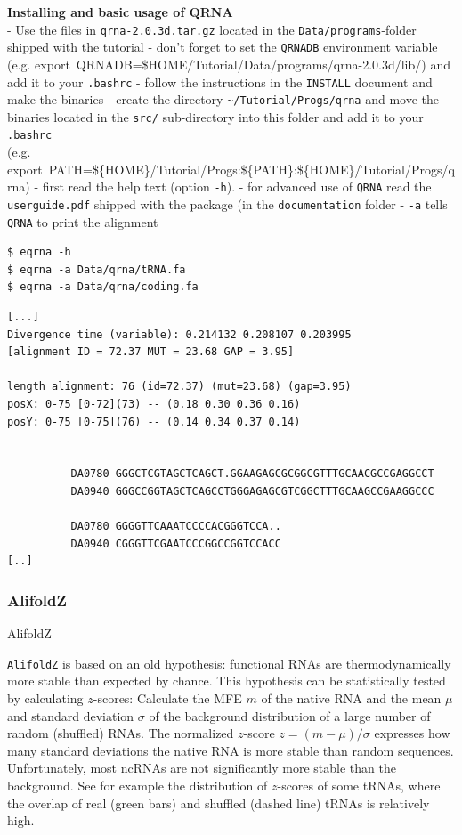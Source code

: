 \documentclass[]{article}
\begin{document}
\textbf{Installing and basic usage of QRNA}\\
- Use the files in \texttt{qrna-2.0.3d.tar.gz} located in the
\texttt{Data/programs}-folder shipped with the tutorial - don't forget
to set the \texttt{QRNADB} environment variable\\
 (e.g. {{export~QRNADB=\$HOME/Tutorial/Data/programs/qrna-2.0.3d/lib/}})
and add it to your \texttt{.bashrc} - follow the instructions in the
\texttt{INSTALL} document and make the binaries - create the directory
\texttt{\textasciitilde{}/Tutorial/Progs/qrna} and move the binaries
located in the \texttt{src/} sub-directory into this folder and add it
to your \texttt{.bashrc}\\
 (e.g.
{{export~PATH=\$\{HOME\}/Tutorial/Progs:\$\{PATH\}:\$\{HOME\}/Tutorial/Progs/qrna}})
- first read the help text (option \texttt{-h}). - for advanced use of
\texttt{QRNA} read the \texttt{userguide.pdf} shipped with the package
(in the \texttt{documentation} folder - \texttt{-a} tells \texttt{QRNA}
to print the alignment

\begin{verbatim}
$ eqrna -h
$ eqrna -a Data/qrna/tRNA.fa
$ eqrna -a Data/qrna/coding.fa
\end{verbatim}

\begin{verbatim}
[...]
Divergence time (variable): 0.214132 0.208107 0.203995
[alignment ID = 72.37 MUT = 23.68 GAP = 3.95]

length alignment: 76 (id=72.37) (mut=23.68) (gap=3.95)
posX: 0-75 [0-72](73) -- (0.18 0.30 0.36 0.16)
posY: 0-75 [0-75](76) -- (0.14 0.34 0.37 0.14)


          DA0780 GGGCTCGTAGCTCAGCT.GGAAGAGCGCGGCGTTTGCAACGCCGAGGCCT
          DA0940 GGGCCGGTAGCTCAGCCTGGGAGAGCGTCGGCTTTGCAAGCCGAAGGCCC

          DA0780 GGGGTTCAAATCCCCACGGGTCCA..
          DA0940 CGGGTTCGAATCCCGGCCGGTCCACC
[..]
\end{verbatim}

\subsubsection{AlifoldZ}{AlifoldZ}\label{alifoldz}

\texttt{AlifoldZ} is based on an old hypothesis: functional RNAs are
thermodynamically more stable than expected by chance. This hypothesis
can be statistically tested by calculating \(z\)-scores: Calculate the
MFE \(m\) of the native RNA and the mean \(\mu\) and standard deviation
\(\sigma\) of the background distribution of a large number of random
(shuffled) RNAs. The normalized \(z\)-score
\(\left. z = \left( {m - \mu} \right)\slash\sigma \right.\) expresses
how many standard deviations the native RNA is more stable than random
sequences. Unfortunately, most ncRNAs are not significantly more stable
than the background. See for example the distribution of \(z\)-scores of
some tRNAs, where the overlap of real (green bars) and shuffled (dashed
line) tRNAs is relatively high.
\end{document}
